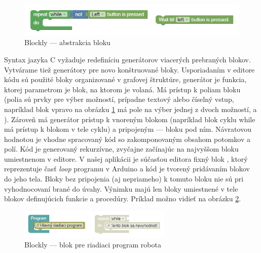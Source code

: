 \begin{figure}
\centerline{\includegraphics[width=1\textwidth]{images/wait-till-couch}}
\caption[Blockly --- abstrakcia bloku ]{Blockly --- abstrakcia bloku }
\label{obr:wait-till-couch}
\end{figure}

Syntax jazyka C vyžaduje redefiníciu generátorov viacerých prebraných blokov. Vytvárame tiež generátory pre novo konštruované bloky. Usporiadaním v editore kódu sú použité bloky organizované v grafovej štruktúre, generátor je funkcia, ktorej parametrom je blok, na ktorom je volaná. Má prístup k poliam bloku (polia sú prvky pre výber možností, prípadne textový alebo číselný vstup, napríklad blok vpravo na obrázku \ref{obr:wait-till-couch} má pole na výber jednej z dvoch možností,  a ). Zároveň má generátor prístup k vnoreným blokom (napríklad blok cyklu while má prístup k blokom v tele cyklu) a pripojeným  --- bloku pod ním. Návratovou hodnotou je vhodne spracovaný kód so zakomponovaným obsahom potomkov a polí. Kód je generovaný rekurzívne, zvyčajne začínajúc na najvyššom bloku umiestnenom v editore. V našej aplikácii je súčasťou editora fixný blok , ktorý reprezentuje časť \textit{loop} programu v Arduino a kód je tvorený pridávaním blokov do jeho tela. Bloky bez pripojenia (aj nepriameho) k tomuto bloku nie sú pri vyhodnocovaní brané do úvahy. Výnimku majú len bloky umiestnené v tele blokov definujúcich funkcie a procedúry. Príklad možno vidieť na obrázku \ref{obr:disabled-orphan-block}.

\begin{figure}
\centerline{\includegraphics[width=0.65\textwidth]{images/disabled-orphan-block}}
\caption[Blockly --- blok pre riadiaci program robota]{Blockly --- blok pre riadiaci program robota}
\label{obr:disabled-orphan-block}
\end{figure}

